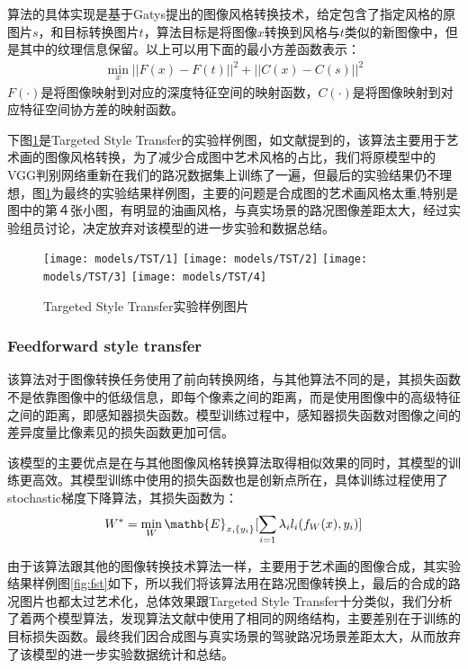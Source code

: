 算法的具体实现是基于Gatys提出的图像风格转换技术\cite{nst}，给定包含了指定风格的原图片$s$，和目标转换图片$t$，算法目标是将图像$x$转换到风格与$t$类似的新图像中，但是其中的纹理信息保留。以上可以用下面的最小方差函数表示：
\begin{align}
    \min_x ||F(x)-F(t)||^2+||C(x)-C(s)||^2
\end{align}
$F(\cdot)$是将图像映射到对应的深度特征空间的映射函数，$C(\cdot)$是将图像映射到对应特征空间协方差的映射函数。

下图\ref{fig:tst}是Targeted Style Transfer的实验样例图，如文献\cite{Targeted-Style-Transfer}提到的，该算法主要用于艺术画的图像风格转换，为了减少合成图中艺术风格的占比，我们将原模型中的VGG判别网络重新在我们的路况数据集上训练了一遍，但最后的实验结果仍不理想，图\ref{fig:tst}为最终的实验结果样例图，主要的问题是合成图的艺术画风格太重,特别是图中的第４张小图，有明显的油画风格，与真实场景的路况图像差距太大，经过实验组员讨论，决定放弃对该模型的进一步实验和数据总结。

\begin{figure}[h]
    \centering
    \texttt{[image: models/TST/1]}
    \texttt{[image: models/TST/2]}
    \texttt{[image: models/TST/3]}
    \texttt{[image: models/TST/4]}
    \caption{Targeted Style Transfer实验样例图片}
    \label{fig:tst}
\end{figure}

\subsubsection{Feedforward style transfer}

 该算法对于图像转换任务使用了前向转换网络，与其他算法不同的是，其损失函数不是依靠图像中的低级信息，即每个像素之间的距离，而是使用图像中的高级特征之间的距离，即感知器损失函数。模型训练过程中，感知器损失函数对图像之间的差异度量比像素见的损失函数更加可信。

该模型的主要优点是在与其他图像风格转换算法取得相似效果的同时，其模型的训练更高效。其模型训练中使用的损失函数也是创新点所在，具体训练过程使用了stochastic梯度下降算法，其损失函数为：
\begin{align}
    W^*=\min_W\mathb{E}_{x,\{y_i\}}[\sum_{i=1}\lambda_il_i(f_W(x),y_i)]
\end{align}

由于该算法跟其他的图像转换技术算法一样，主要用于艺术画的图像合成，其实验结果样例图\ref{fig:fst}如下，所以我们将该算法用在路况图像转换上，最后的合成的路况图片也都太过艺术化，总体效果跟Targeted Style Transfer十分类似，我们分析了着两个模型算法，发现算法文献中使用了相同的网络结构，主要差别在于训练的目标损失函数。最终我们因合成图与真实场景的驾驶路况场景差距太大，从而放弃了该模型的进一步实验数据统计和总结。 


